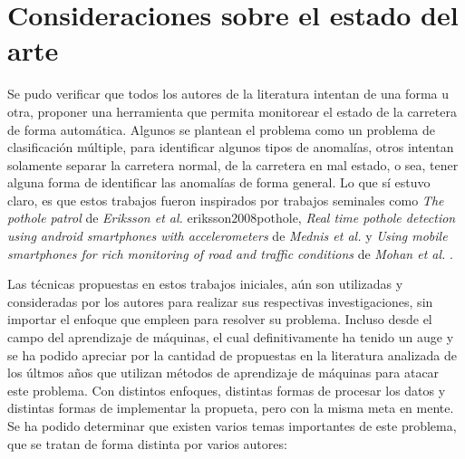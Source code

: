 \section{Consideraciones sobre el estado del arte}
	Se pudo verificar que todos los autores de la literatura intentan de una forma u otra, proponer una herramienta que permita monitorear el estado de 
	la carretera de forma automática. Algunos se plantean el problema como un problema de clasificación múltiple, para identificar algunos tipos de anomalías,
	otros intentan solamente separar la carretera normal, de la carretera en mal estado, o sea, tener alguna forma de identificar las anomalías de forma general.
	Lo que sí estuvo claro, es que estos trabajos fueron inspirados por trabajos seminales como \emph{The pothole patrol} de \emph{Eriksson et al.} \brackcite
	{eriksson2008pothole}, \emph{Real time pothole detection using android smartphones with accelerometers} de \emph{Mednis et al.}  y 
	\emph{Using mobile smartphones for rich monitoring of road and traffic conditions} de \emph{Mohan et al.} . 

	Las técnicas propuestas en estos trabajos iniciales, aún son utilizadas y consideradas por los autores para realizar sus respectivas investigaciones,
	sin importar el enfoque que empleen para resolver su problema. Incluso desde el campo del aprendizaje de máquinas, el cual definitivamente ha tenido
	un auge y se ha podido apreciar por la cantidad de propuestas en la literatura analizada de los últmos años que utilizan métodos de aprendizaje de
	máquinas para atacar este problema. Con distintos enfoques, distintas formas de procesar los datos y distintas formas de implementar la propueta,
	pero con la misma meta en mente. Se ha podido determinar que existen varios temas importantes de este problema, que se tratan de forma distinta por
	varios autores:

